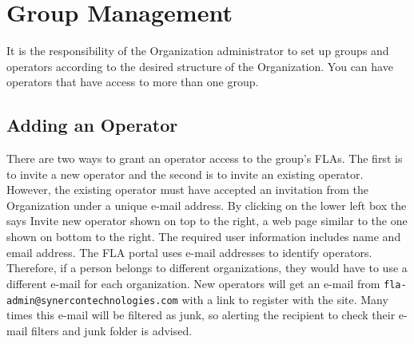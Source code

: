 \documentclass[11pt, oneside]{book}
\begin{document}
\section{Group Management}

It is the responsibility of the Organization administrator to set
up groups and operators according to the desired structure of the
Organization. You can have operators that have access to more than
one group.




\subsection{Adding an Operator}

\noindent\begin{minipage}{0.45\textwidth}%
There are two ways to grant an operator access to the group's FLAs.
The first is to invite a new operator and the second is to invite
an existing operator. However, the existing operator must have accepted
an invitation from the Organization under a unique e-mail address.
By clicking on the lower left box the says \textsf{Invite new operator}
shown on top to the right, a web page similar to
the one shown on bottom to the right. The required
user information includes name and email address. The FLA portal uses
e-mail addresses to identify operators. Therefore, if a person belongs
to different organizations, they would have to use a different e-mail
for each organization. New operators will get an e-mail from \texttt{fla-admin@synercontechnologies.com}
with a link to register with the site. Many times this e-mail will
be filtered as junk, so alerting the recipient to check their e-mail
filters and junk folder is advised.


\end{minipage}%
\hfill%
\end{document}
